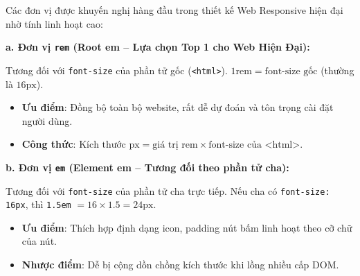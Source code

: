 \documentclass[11pt,oneside]{book}
\newcommand{\codeinline}[1]{\textcolor{accentOrange}{\texttt{#1}}}
\begin{document}
\begin{tipBox}
Các đơn vị được khuyến nghị hàng đầu trong thiết kế Web Responsive hiện đại nhờ tính linh hoạt cao:

\begin{tcolorbox}[arc=4pt, colback=white, colframe=tipBorder!30, boxrule=0.6pt, top=6pt, bottom=6pt, left=10pt, right=10pt]
  {\sffamily\bfseries\color{tipBorder} a. Đơn vị \codeinline{rem} (Root em -- Lựa chọn Top 1 cho Web Hiện Đại):}\par\vspace{3pt}
  Tương đối với \codeinline{font-size} của phần tử gốc (\codeinline{<html>}). $1\text{rem} = \text{font-size gốc}$ (thường là $16\text{px}$).
  \begin{itemize}[leftmargin=1.2em, itemsep=2pt, parsep=0pt]
      \item \textcolor{green!60!black}{\textbf{Ưu điểm}}: Đồng bộ toàn bộ website, rất dễ dự đoán và tôn trọng cài đặt người dùng.
      \item \textbf{Công thức}: $\text{Kích thước px} = \text{giá trị rem} \times \text{font-size của <html>}$.
  \end{itemize}
\end{tcolorbox}

\par\vspace{4pt}

\begin{tcolorbox}[arc=4pt, colback=white, colframe=secondaryTeal!30, boxrule=0.6pt, top=6pt, bottom=6pt, left=10pt, right=10pt]
  {\sffamily\bfseries\color{secondaryTeal} b. Đơn vị \codeinline{em} (Element em -- Tương đối theo phần tử cha):}\par\vspace{3pt}
  Tương đối với \codeinline{font-size} của phần tử cha trực tiếp. Nếu cha có \codeinline{font-size: 16px}, thì \codeinline{1.5em} $= 16 \times 1.5 = 24\text{px}$.
  \begin{itemize}[leftmargin=1.2em, itemsep=2pt, parsep=0pt]
      \item \textcolor{green!60!black}{\textbf{Ưu điểm}}: Thích hợp định dạng icon, padding nút bấm linh hoạt theo cỡ chữ của nút.
      \item \textcolor{red!80!black}{\textbf{Nhược điểm}}: Dễ bị cộng dồn chồng kích thước khi lồng nhiều cấp DOM.
  \end{itemize}
\end{tcolorbox}


\end{tipBox}
\end{document}

